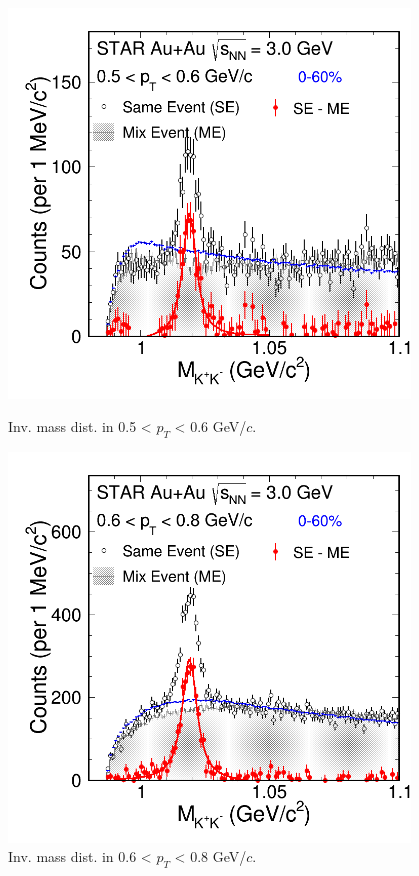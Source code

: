 \begin{figure}[htbp]
\begin{minipage}[htbp]{0.45\linewidth}
\centering
\includegraphics[width=0.95\textwidth]{chapterY/fig/fig1_signal_0_2.png}
\caption{Inv. mass dist. in 0.5 < $p_T$ < 0.6 GeV/$c$. \label{fig:mixedEvent_pT2}}
\end{minipage}
\hfill
\begin{minipage}[htbp]{0.45\linewidth}
\centering
\includegraphics[width=0.95\textwidth]{chapterY/fig/fig1_signal_0_3.png} 
\caption{Inv. mass dist. in 0.6 < $p_T$ < 0.8 GeV/$c$. \label{fig:mixedEvent_pT3}}
\end{minipage}
\end{figure}

